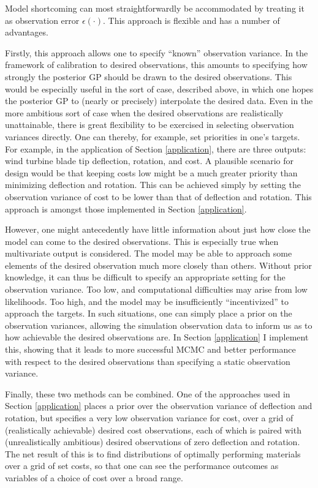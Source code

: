 \documentclass{article}
\begin{document}

Model shortcoming can most straightforwardly be accommodated by treating it as observation error $\epsilon(\cdot)$. This approach is flexible and has a number of advantages.

Firstly, this approach allows one to specify ``known'' observation variance. In the framework of calibration to desired observations, this amounts to specifying how strongly the posterior GP should be drawn to the desired observations. This would be especially useful in the sort of case, described above, in which one hopes the posterior GP to (nearly or precisely) interpolate the desired data. Even in the more ambitious sort of case when the desired observations are realistically unattainable, there is great flexibility to be exercised in selecting observation variances directly. One can thereby, for example, set priorities in one's targets. For example, in the application of Section \ref{application}, there are three outputs: wind turbine blade tip deflection, rotation, and cost. A plausible scenario for design would be that keeping costs low might be a much greater priority than minimizing deflection and rotation. This can be achieved simply by setting the observation variance of cost to be lower than that of deflection and rotation. This approach is amongst those implemented in Section \ref{application}.

However, one might antecedently have little information about just how close the model can come to the desired observations. This is especially true when multivariate output is considered. The model may be able to approach some elements of the desired observation much more closely than others. Without prior knowledge, it can thus be difficult to specify an appropriate setting for the observation variance. Too low, and computational difficulties may arise from low likelihoods. Too high, and the model may be insufficiently ``incentivized'' to approach the targets. In such situations, one can simply place a prior on the observation variances, allowing the simulation observation data to inform us as to how achievable the desired observations are. In Section \ref{application} I implement this, showing that it leads to more successful MCMC and better performance with respect to the desired observations than specifying a static observation variance.

Finally, these two methods can be combined. One of the approaches used in Section \ref{application} places a prior over the observation variance of deflection and rotation, but specifies a very low observation variance for cost, over a grid of (realistically achievable) desired cost observations, each of which is paired with (unrealistically ambitious) desired observations of zero deflection and rotation. The net result of this is to find distributions of optimally performing materials over a grid of set costs, so that one can see the performance outcomes as variables of a choice of cost over a broad range.
\end{document}
